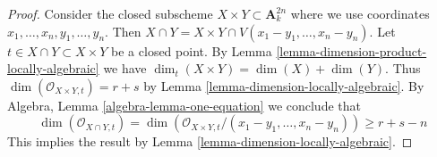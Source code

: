 \documentclass[10pt,a4paper]{amsart}
\theoremstyle{plain}
\theoremstyle{definition}
\theoremstyle{remark}
\numberwithin{equation}{subsection}
\begin{document}
\begin{proof}
Consider the closed subscheme $X \times Y \subset \mathbf{A}^{2n}_k$
where we use coordinates $x_1, \ldots, x_n, y_1, \ldots, y_n$. Then
$X \cap Y = X \times Y \cap V(x_1 - y_1, \ldots, x_n - y_n)$.
Let $t \in X \cap Y \subset X \times Y$ be a closed point.
By Lemma \ref{lemma-dimension-product-locally-algebraic}
we have $\dim_t(X \times Y) = \dim(X) + \dim(Y)$.
Thus $\dim(\mathcal{O}_{X \times Y, t}) = r + s$ by
Lemma \ref{lemma-dimension-locally-algebraic}.
By Algebra, Lemma \ref{algebra-lemma-one-equation}
we conclude that
$$
\dim(\mathcal{O}_{X \cap Y, t}) =
\dim(\mathcal{O}_{X \times Y, t}/(x_1 - y_1, \ldots, x_n - y_n)) \geq
r + s - n
$$
This implies the result by Lemma \ref{lemma-dimension-locally-algebraic}.
\end{proof}
\end{document}
